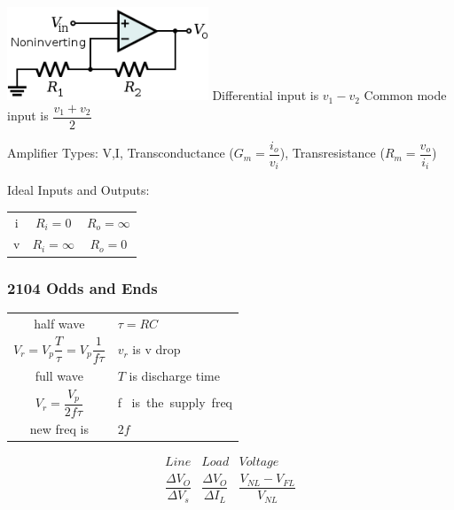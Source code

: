 \documentclass[a4paper,12pt]{article}
\begin{document}
\begin{multicols}{2}
\includegraphics[width=60mm]{noninverting-amp.png} 
\vfill
Differential input is $v_1 - v_2$ Common mode input is $\dfrac{v_1+v_2}{2}$

Amplifier Types: V,I, Transconductance ($G_m=\dfrac{i_o}{v_i}$),
Transresistance ($R_m=\dfrac{v_o}{i_i}$)

Ideal Inputs and Outputs: 
\begin{tabular}{ccc}
i&$R_i=0$&$R_o=\infty$\\
v&$R_i=\infty$&$R_o=0$\\
\end{tabular}
\subsubsection*{2104 Odds and Ends}

\begin{tabular}{cl}
half wave&$\tau= RC$\\
$V_r = V_p \dfrac{T}{\tau} = V_p\dfrac{1}{f\tau }$&$v_r$ is v drop\\
full wave&$T$ is discharge time\\
$V_r = \dfrac{V_p}{2f\tau }$&f \mbox{ is the supply freq}\\
new freq is&$2f$\\
\end{tabular}

\vfill

\[
\begin{array}{ccc}
Line    &   Load    &   Voltage\\
\dfrac{\Delta V_O}{ \Delta V_s} &\dfrac{\Delta V_O }{\Delta I_L }&\dfrac{V_{NL}
- V_{FL}}{V_{NL}}\\


\end{array}\]
\end{multicols}
\end{document}
